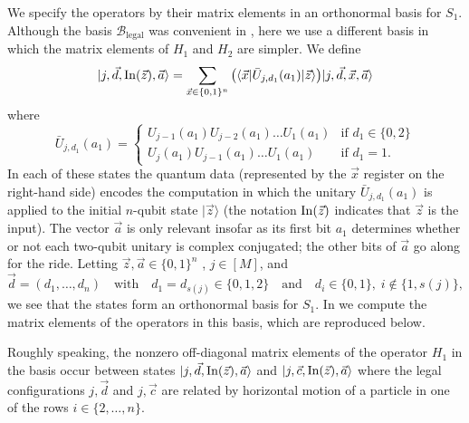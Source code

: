 \documentclass[../thesis-main/thesis-main]{subfiles}
\begin{document}
We specify the operators  by their matrix elements in an orthonormal basis for $S_{1}$. Although the basis $\mathcal{B}_{\text{legal}}$ was convenient in , here we use a different basis in which the matrix elements of $H_{1}$ and $H_{2}$ are simpler. We define
\begin{equation}
  |j,\vec{d},\operatorname{In}(\vec{z}),\vec{a}\rangle
  =\sum_{\vec{x}\in\{0,1\}^{n}} \big(\langle\vec{x} 
   |\bar{U}_{j,d_1}(a_{1}) 
   |\vec{z}\rangle\big)|j,\vec{d},\vec{x},\vec{a}\rangle 
  \label{eq:phi_init_basis}
\end{equation}
where
\begin{equation}
  \bar{U}_{j,d_1}(a_1) = \begin{cases}
    U_{j-1}(a_1) U_{j-2}(a_1) \ldots U_1(a_1) & \text{if $d_1 \in \{0,2\}$} \\
    U_j(a_1) U_{j-1}(a_1) \ldots U_1(a_1) & \text{if $d_1=1$}.
  \end{cases}
  \label{eq:ubar}
\end{equation}
In each of these states the quantum data (represented by the $\vec{x}$ register on the right-hand side) encodes the computation in which the unitary $\bar{U}_{j,d_1}(a_1)$ is applied to the initial $n$-qubit state $|\vec{z}\rangle$ (the notation $\operatorname{In}(\vec{z})$ indicates that $\vec{z}$ is the input). The vector $\vec{a}$ is only relevant insofar as its first bit $a_{1}$ determines whether or not each two-qubit unitary is complex conjugated; the other bits of $\vec{a}$ go along for the ride. Letting $\vec{z},\vec{a}\in\{0,1\}^{n}$ , $j\in[M]$, and \[ \vec{d}=(d_{1},\ldots,d_{n})\quad\text{with}\quad d_{1}=d_{s(j)}\in\{0,1,2\}\quad\text{and}\quad d_{i}\in\{0,1\},\; i\notin\{1,s(j)\}, \] we see that the states  form an orthonormal basis for $S_{1}$. In  we compute the matrix elements of the operators  in this basis, which are reproduced below.

Roughly speaking, the nonzero off-diagonal matrix elements of the operator $H_{1}$ in the basis  occur between states $|j,\vec{d},\operatorname{In}(\vec{z}),\vec{a}\rangle$ and $|j,\vec{c},\operatorname{In}(\vec{z}),\vec{a}\rangle$ where the legal configurations $j,\vec{d}$ and $j,\vec{c}$ are related by horizontal motion of a particle in one of the rows $i\in\{2,\ldots,n\}$. 
\end{document}
